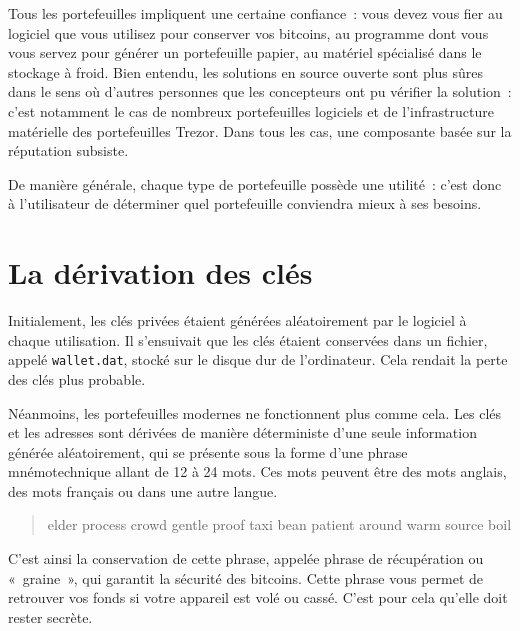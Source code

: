 Tous les portefeuilles impliquent une certaine confiance~: vous devez vous fier au logiciel que vous utilisez pour conserver vos bitcoins, au programme dont vous vous servez pour générer un portefeuille papier, au matériel spécialisé dans le stockage à froid. Bien entendu, les solutions en source ouverte sont plus sûres dans le sens où d'autres personnes que les concepteurs ont pu vérifier la solution~: c'est notamment le cas de nombreux portefeuilles logiciels et de l'infrastructure matérielle des portefeuilles Trezor. Dans tous les cas, une composante basée sur la réputation subsiste.

De manière générale, chaque type de portefeuille possède une utilité~: c'est donc à l'utilisateur de déterminer quel portefeuille conviendra mieux à ses besoins.

\section*{La dérivation des clés}


Initialement, les clés privées étaient générées aléatoirement par le logiciel à chaque utilisation. Il s'ensuivait que les clés étaient conservées dans un fichier, appelé \verb?wallet.dat?, stocké sur le disque dur de l'ordinateur. Cela rendait la perte des clés plus probable.

Néanmoins, les portefeuilles modernes ne fonctionnent plus comme cela. Les clés et les adresses sont dérivées de manière déterministe d'une seule information générée aléatoirement, qui se présente sous la forme d'une phrase mnémotechnique allant de 12 à 24 mots. Ces mots peuvent être des mots anglais, des mots français ou dans une autre langue.


\begin{quote}
elder process crowd gentle proof taxi bean patient around warm source boil
\end{quote}

C'est ainsi la conservation de cette phrase, appelée phrase de récupération ou «~graine~», qui garantit la sécurité des bitcoins. Cette phrase vous permet de retrouver vos fonds si votre appareil est volé ou cassé. C'est pour cela qu'elle doit rester secrète.

